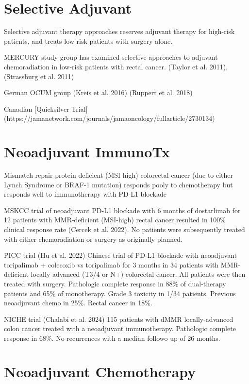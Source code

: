 \documentclass[
  letterpaper,
]{scrbook}
\begin{document}
\section{Selective Adjuvant}\label{selective-adjuvant}

Selective adjuvant therapy approaches reserves adjuvant therapy for
high-risk patients, and treats low-risk patients with surgery alone.

MERCURY study group has examined selective approaches to adjuvant
chemoradiation in low-risk patients with rectal cancer. (Taylor et al.
2011), (Strassburg et al. 2011)

German OCUM group (Kreis et al. 2016) (Ruppert et al. 2018)

Canadian {[}Quicksilver Trial{]}
(https://jamanetwork.com/journals/jamaoncology/fullarticle/2730134)

\section{Neoadjuvant ImmunoTx}\label{neoadjuvant-immunotx}

Mismatch repair protein deficient (MSI-high) colorectal cancer (due to
either Lynch Syndrome or BRAF-1 mutation) responds pooly to chemotherapy
but responds well to immunotherapy with PD-L1 blockade

MSKCC trial of neoadjuvant PD-L1 blockade with 6 months of dostarlimab
for 12 patients with MMR-deficient (MSI-high) rectal cancer resulted in
100\% clinical response rate (Cercek et al. 2022). No patients were
subsequently treated with either chemoradiation or surgery as originally
planned.

PICC trial (Hu et al. 2022) Chinese trial of PD-L1 blockade with
neoadjuvant toripalimab + colecoxib vs toripalimab for 3 months in 34
patients with MMR-deficient locally-advanced (T3/4 or N+) colorectal
cancer. All patients were then treated with surgery. Pathologic complete
response in 88\% of dual-therapy patients and 65\% of monotherapy. Grade
3 toxicity in 1/34 patients. Previous neoadjuvant chemo in 25\%. Rectal
cancer in 18\%.

NICHE trial (Chalabi et al. 2024) 115 patients with dMMR
locally-advanced colon cancer treated with a neoadjuvant immunotherapy.
Pathologic complete response in 68\%. No recurrences with a median
followo up of 26 months.

\section{Neoadjuvant Chemotherapy}\label{neoadjuvant-chemotherapy}
\end{document}
